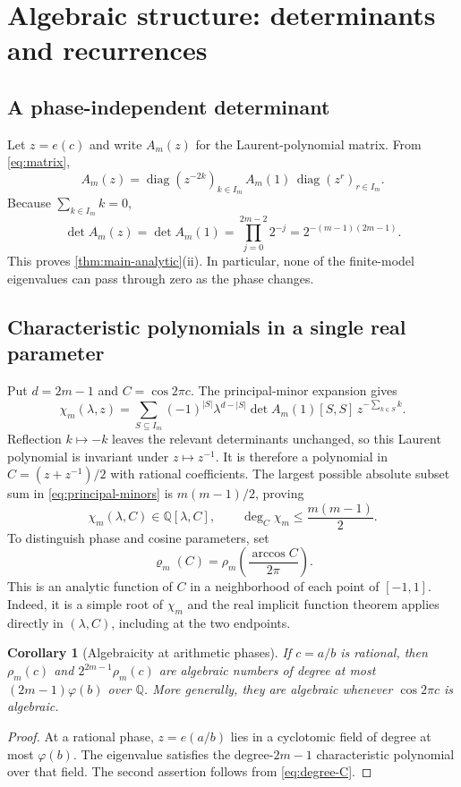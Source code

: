 \documentclass[11pt,a4paper]{article}
\numberwithin{equation}{section}
\newtheorem{corollary}[corollary]{Corollary}
\theoremstyle{definition}
\theoremstyle{remark}
\newcommand{\QQ}{\mathbb Q}
\begin{document}
\section{Algebraic structure: determinants and recurrences}
\label{sec:algebra}

\subsection{A phase-independent determinant}
Let $z=e(c)$ and write $A_m(z)$ for the Laurent-polynomial matrix.
From \cref{eq:matrix},
\[
 A_m(z)=\operatorname{diag}(z^{-2k})_{k\in I_m}\,
 A_m(1)\,\operatorname{diag}(z^r)_{r\in I_m}.
\]
Because $\sum_{k\in I_m}k=0$,
\begin{equation}
 \det A_m(z)=\det A_m(1)
 =\prod_{j=0}^{2m-2}2^{-j}
 =2^{-(m-1)(2m-1)}.
 \label{eq:det}
\end{equation}
This proves \cref{thm:main-analytic}(ii). In particular, none of the
finite-model eigenvalues can pass through zero as the phase changes.

\subsection{Characteristic polynomials in a single real parameter}
Put $d=2m-1$ and $C=\cos2\pi c$. The principal-minor expansion gives
\begin{equation}
 \chi_m(\lambda,z)=
 \sum_{S\subseteq I_m}(-1)^{|S|}\lambda^{d-|S|}
 \det A_m(1)[S,S]\,z^{-\sum_{k\in S}k}.
 \label{eq:principal-minors}
\end{equation}
Reflection $k\mapsto-k$ leaves the relevant determinants unchanged, so
this Laurent polynomial is invariant under $z\mapsto z^{-1}$.
It is therefore a polynomial in $C=(z+z^{-1})/2$ with rational
coefficients. The largest possible absolute subset sum in
\cref{eq:principal-minors} is $m(m-1)/2$, proving
\begin{equation}
 \chi_m(\lambda,C)\in\QQ[\lambda,C],\qquad
 \deg_C\chi_m\leq\frac{m(m-1)}2.
 \label{eq:degree-C}
\end{equation}
To distinguish phase and cosine parameters, set
\[
 \varrho_m(C)=\rho_m\!\left(\frac{\arccos C}{2\pi}\right).
\]
This is an analytic function of $C$ in a neighborhood of each point
of $[-1,1]$. Indeed, it is a simple root of
$\chi_m$ and the real implicit function theorem applies directly in
$(\lambda,C)$, including at the two endpoints.

\begin{corollary}[Algebraicity at arithmetic phases]
If $c=a/b$ is rational, then $\rho_m(c)$ and
$2^{2m-1}\rho_m(c)$ are algebraic numbers of degree at most
$(2m-1)\varphi(b)$ over $\QQ$.
More generally, they are algebraic whenever $\cos2\pi c$ is algebraic.
\end{corollary}
\begin{proof}
At a rational phase, $z=e(a/b)$ lies in a cyclotomic field of degree at
most $\varphi(b)$. The eigenvalue satisfies the degree-$2m-1$
characteristic polynomial over that field. The second assertion follows
from \cref{eq:degree-C}.
\end{proof}
\end{document}
